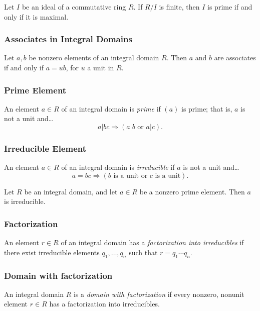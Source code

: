 \begin{corollary}
Let $I$ be an ideal of a commutative ring $R$. If $R/I$ is finite, then $I$ is prime if and only if it is maximal.
\end{corollary}

\subsubsection{Associates in Integral Domains}

\begin{lemma}
Let $a,b$ be nonzero elements of an integral domain $R$. Then $a$ and $b$ are associates if and only if $a = ub$, for
$u$ a unit in $R$.
\end{lemma}

\subsubsection{Prime Element}\label{primeelement}
An element $a \in R$ of an integral domain is \emph{prime} if $(a)$ is prime; that is, $a$ is not a unit and\dots
$$a | bc \Rightarrow (a|b \textrm{ or } a|c).$$

\subsubsection{Irreducible Element}\label{irreducibleelement}
An element $a \in R$ of an integral domain is \emph{irreducible} if $a$ is not a unit and\dots
$$a = bc \Rightarrow (b \textrm{ is a unit or } c \textrm{ is a unit}).$$

\begin{lemma}
Let $R$ be an integral domain, and let $a \in R$ be a nonzero prime element. Then $a$ is irreducible.
\end{lemma}

\subsubsection{Factorization}\label{factorization}
An element $r \in R$ of an integral domain has a \emph{factorization into irreducibles} if there exist irreducible elements $q_1, \dots, q_n$
such that $r = q_1 \cdots q_n$.

\subsubsection{Domain with factorization}\label{domainfactorization}
An integral domain $R$ is a \emph{domain with factorization} if every nonzero, nonunit element $r \in R$ has a factorization into irreducibles.

